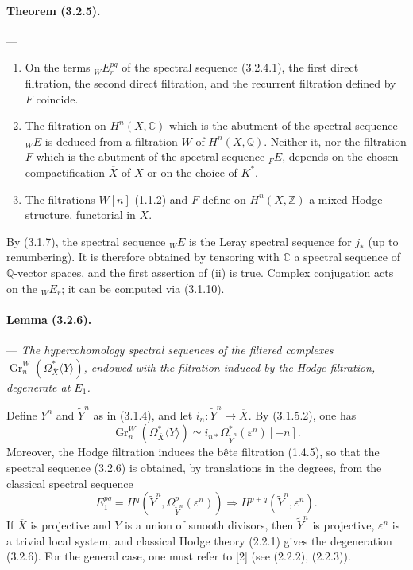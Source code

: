 \documentclass[10pt]{article}
\newcommand{\C}{\mathbb C}
\newcommand{\Q}{\mathbb Q}
\newcommand{\Z}{\mathbb Z}
\newcommand{\Gr}{\operatorname{Gr}}
\begin{document}
\paragraph{Theorem (3.2.5).} --- {\itshape
\begin{enumerate}[label=(\roman*),font=\itshape]
\item On the terms ${}_WE_r^{pq}$ of the spectral sequence (3.2.4.1), the first direct filtration, the second direct filtration, and the recurrent filtration defined by $F$ coincide.
\item The filtration on $H^n(X,\C)$ which is the abutment of the spectral sequence ${}_WE$ is deduced from a filtration $W$ of $H^n(X,\Q)$. Neither it, nor the filtration $F$ which is the abutment of the spectral sequence ${}_FE$, depends on the chosen compactification $\overline X$ of $X$ or on the choice of $K^*$.
\item The filtrations $W[n]$ (1.1.2) and $F$ define on $H^n(X,\Z)$ a mixed Hodge structure, functorial in $X$.
\end{enumerate}}

By (3.1.7), the spectral sequence ${}_WE$ is the Leray spectral sequence for $j_*$ (up to renumbering). It is therefore obtained by tensoring with $\C$ a spectral sequence of $\Q$-vector spaces, and the first assertion of (ii) is true. Complex conjugation acts on the ${}_WE_r$; it can be computed via (3.1.10).

\paragraph{Lemma (3.2.6).} --- {\itshape The hypercohomology spectral sequences of the filtered complexes $\Gr_n^W(\Omega_{\overline X}^{*}\langle Y\rangle)$, endowed with the filtration induced by the Hodge filtration, degenerate at $E_1$.}

Define $Y^n$ and $\widetilde Y^n$ as in (3.1.4), and let $i_n:\widetilde Y^n\to\overline X$. By (3.1.5.2), one has
\[
\Gr_n^W(\Omega_{\overline X}^{*}\langle Y\rangle)
\simeq i_{n*}\Omega_{\widetilde Y^n}^{*}(\varepsilon^n)[-n].
\]
Moreover, the Hodge filtration induces the bête filtration (1.4.5), so that the spectral sequence (3.2.6) is obtained, by translations in the degrees, from the classical spectral sequence
\[
E_1^{pq}=H^q(\widetilde Y^n,\Omega_{\widetilde Y^n}^p(\varepsilon^n))
\Rightarrow H^{p+q}(\widetilde Y^n,\varepsilon^n).
\]
If $\overline X$ is projective and $Y$ is a union of smooth divisors, then $\widetilde Y^n$ is projective, $\varepsilon^n$ is a trivial local system, and classical Hodge theory (2.2.1) gives the degeneration (3.2.6). For the general case, one must refer to [2] (see (2.2.2), (2.2.3)).
\end{document}
